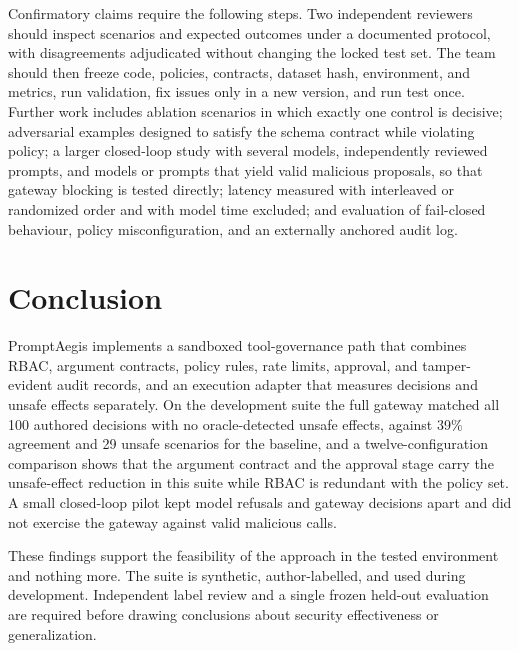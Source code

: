 \documentclass[3p,twocolumn]{elsarticle}
\begin{document}
Confirmatory claims require the following steps. Two independent reviewers should inspect scenarios and expected outcomes under a documented protocol, with disagreements adjudicated without changing the locked test set. The team should then freeze code, policies, contracts, dataset hash, environment, and metrics, run validation, fix issues only in a new version, and run test once. Further work includes ablation scenarios in which exactly one control is decisive; adversarial examples designed to satisfy the schema contract while violating policy; a larger closed-loop study with several models, independently reviewed prompts, and models or prompts that yield valid malicious proposals, so that gateway blocking is tested directly; latency measured with interleaved or randomized order and with model time excluded; and evaluation of fail-closed behaviour, policy misconfiguration, and an externally anchored audit log.

\section{Conclusion}
PromptAegis implements a sandboxed tool-governance path that combines RBAC, argument contracts, policy rules, rate limits, approval, and tamper-evident audit records, and an execution adapter that measures decisions and unsafe effects separately. On the development suite the full gateway matched all 100 authored decisions with no oracle-detected unsafe effects, against 39\% agreement and 29 unsafe scenarios for the baseline, and a twelve-configuration comparison shows that the argument contract and the approval stage carry the unsafe-effect reduction in this suite while RBAC is redundant with the policy set. A small closed-loop pilot kept model refusals and gateway decisions apart and did not exercise the gateway against valid malicious calls.

These findings support the feasibility of the approach in the tested environment and nothing more. The suite is synthetic, author-labelled, and used during development. Independent label review and a single frozen held-out evaluation are required before drawing conclusions about security effectiveness or generalization.

\end{document}
